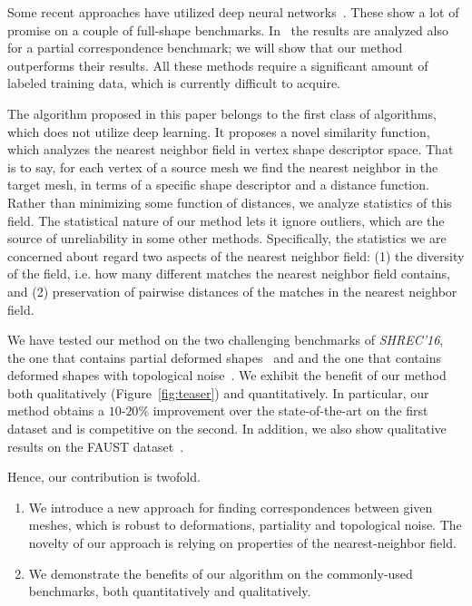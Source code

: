 Some recent approaches have utilized deep neural networks~\cite{boscaini2016learning,litany2017deep,Masci:2015:GCN:2919341.2920992,monti2017geometric}.
These show a lot of promise on a couple of full-shape benchmarks. 
In~\cite{boscaini2016learning} the results are analyzed also for a  partial correspondence benchmark; 
we will show that our method outperforms their results.
All these methods require a significant amount of labeled training data, which is currently difficult to acquire. 

The algorithm proposed in this paper belongs to the first class of algorithms, which does not utilize deep learning.
It proposes a novel similarity function, which analyzes the nearest neighbor field in vertex shape descriptor space.
That is to say, for each vertex of a source mesh we find the nearest neighbor in the target mesh, in terms of a specific shape descriptor and a distance function.
Rather than minimizing some function of distances, we analyze statistics of this field.
The statistical nature of our method lets it ignore outliers, which are the source of unreliability in some other methods.
Specifically, the statistics we are concerned about regard two aspects of the nearest neighbor field:
(1) the diversity of the field, i.e. how many different matches the nearest neighbor field contains, and
(2) preservation of pairwise distances of the matches in the nearest neighbor field.

We have tested our method on the two challenging benchmarks of {\em SHREC'16}, the one that contains partial deformed shapes~\cite{cosmo2016shrec} and and the one that contains deformed shapes with topological noise~\cite{lahner2016shrec}.
We exhibit the benefit of our method both qualitatively (Figure~\ref{fig:teaser}) and quantitatively.
In particular, our method obtains a $10$-$20\%$ improvement over the state-of-the-art on the first dataset and is competitive on the second.
In addition, we also show qualitative results on the FAUST dataset~\cite{bogo2014faust}.

Hence, our contribution is twofold.
\begin{enumerate}
	\item
	We introduce a new approach for finding correspondences between given meshes, which is robust to deformations, partiality and topological noise.
	The novelty of our approach is relying on properties of the nearest-neighbor field.
	\item
	We demonstrate the benefits of our algorithm on the commonly-used benchmarks, both quantitatively and qualitatively.
\end{enumerate}
